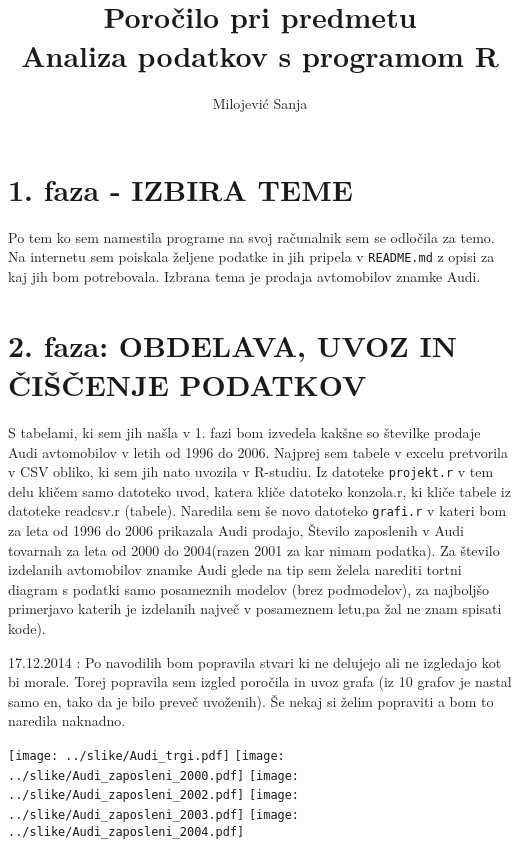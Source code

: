 \documentclass[11pt,a4paper]{article}
\begin{document}
\title{Poročilo pri predmetu \\
Analiza podatkov s programom R}
\author{Milojević Sanja}
\maketitle

\section{1. faza - IZBIRA TEME}
Po tem ko sem namestila programe na svoj računalnik sem se odločila za temo. Na internetu sem poiskala željene podatke in jih pripela v \verb|README.md| z opisi za kaj jih bom potrebovala. Izbrana tema je prodaja avtomobilov znamke Audi.

\section{2. faza: OBDELAVA, UVOZ IN ČIŠČENJE PODATKOV}
S tabelami, ki sem jih našla v 1. fazi bom izvedela kakšne so številke prodaje Audi avtomobilov v letih od 1996 do 2006. Najprej sem tabele v excelu pretvorila v CSV obliko, ki sem jih nato uvozila v R-studiu. Iz datoteke \verb|projekt.r| v tem delu kličem samo datoteko uvod, katera kliče datoteko konzola.r, ki kliče tabele iz datoteke readcsv.r (tabele).
Naredila sem še novo datoteko \verb|grafi.r| v kateri bom za leta od 1996 do 2006 prikazala Audi prodajo, Število zaposlenih v Audi tovarnah za leta od 2000 do 2004(razen 2001 za kar nimam podatka). Za število izdelanih avtomobilov znamke Audi glede na tip sem želela narediti tortni diagram s podatki samo posameznih modelov (brez podmodelov), za najboljšo primerjavo katerih je izdelanih največ v posameznem letu,pa žal ne znam spisati kode).

17.12.2014 : Po navodilih bom popravila stvari ki ne delujejo ali ne izgledajo kot bi morale. Torej popravila sem izgled poročila in uvoz grafa (iz 10 grafov je nastal samo en, tako da je bilo preveč uvoženih). Še nekaj si želim popraviti a bom to naredila naknadno.

\texttt{[image: ../slike/Audi\_trgi.pdf]}
\texttt{[image: ../slike/Audi\_zaposleni\_2000.pdf]}
\texttt{[image: ../slike/Audi\_zaposleni\_2002.pdf]}
\texttt{[image: ../slike/Audi\_zaposleni\_2003.pdf]}
\texttt{[image: ../slike/Audi\_zaposleni\_2004.pdf]}
\end{document}

